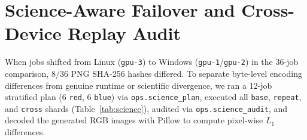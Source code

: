 \documentclass[11pt,a4paper]{article}
\begin{document}
\FloatBarrier
\section{Science-Aware Failover and Cross-Device Replay Audit}
When jobs shifted from Linux (\texttt{gpu-3}) to Windows (\texttt{gpu-1}/\texttt{gpu-2}) in the 36-job comparison, $8/36$ PNG SHA-256 hashes differed. To separate byte-level encoding differences from genuine runtime or scientific divergence, we ran a 12-job stratified plan ($6$ \texttt{red}, $6$ \texttt{blue}) via \texttt{ops.science\_plan}, executed all \texttt{base}, \texttt{repeat}, and \texttt{cross} shards (Table~\ref{tab:science}), audited via \texttt{ops.science\_audit}, and decoded the generated RGB images with Pillow to compute pixel-wise $L_1$ differences.

\begin{table}[ht]
\centering
\small
{}
\caption{Live 3-GPU stratified science audit and pinned failover runs (raw audit in \texttt{science-audit-20261125.json}).}
\label{tab:science}
\end{table}
\end{document}
